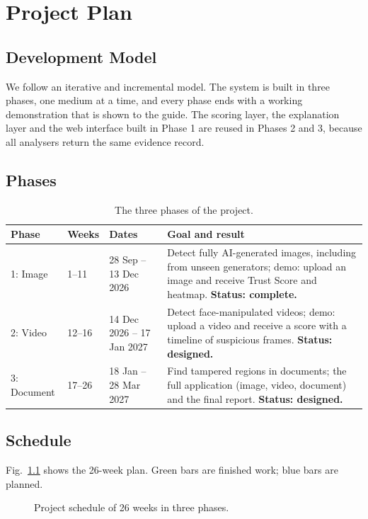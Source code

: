 \chapter{Project Plan}

\section{Development Model}
We follow an iterative and incremental model. The system is built in three phases, one medium at a time, and every phase ends with a working demonstration that is shown to the guide. The scoring layer, the explanation layer and the web interface built in Phase 1 are reused in Phases 2 and 3, because all analysers return the same evidence record.

\section{Phases}
\begin{table}[htbp]
\centering\small
\caption{The three phases of the project.}
\begin{tabularx}{\linewidth}{@{}p{1.9cm} p{1.2cm} p{3.0cm} X@{}}
\toprule
Phase & Weeks & Dates & Goal and result\\
\midrule
1: Image & 1--11 & 28 Sep -- 13 Dec 2026 & Detect fully AI-generated images, including from unseen generators; demo: upload an image and receive Trust Score and heatmap. \textbf{Status: complete.}\\
2: Video & 12--16 & 14 Dec 2026 -- 17 Jan 2027 & Detect face-manipulated videos; demo: upload a video and receive a score with a timeline of suspicious frames. \textbf{Status: designed.}\\
3: Document & 17--26 & 18 Jan -- 28 Mar 2027 & Find tampered regions in documents; the full application (image, video, document) and the final report. \textbf{Status: designed.}\\
\bottomrule
\end{tabularx}
\end{table}

\section{Schedule}
Fig.~\ref{fig:gantt} shows the 26-week plan. Green bars are finished work; blue bars are planned.

\begin{figure}[htbp]
  \centering
  
  \caption{Project schedule of 26 weeks in three phases.}\label{fig:gantt}
\end{figure}

